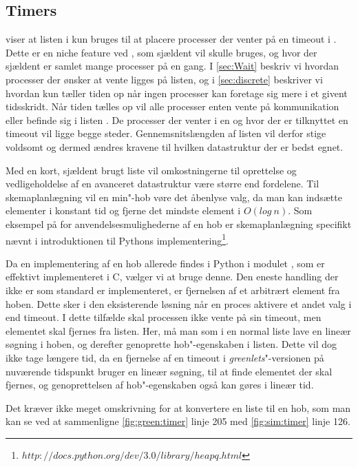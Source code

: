\subsection{Timers}  
 viser at listen  i \pycsp kun bruges til at placere processer der venter på en timeout i . Dette er en niche feature ved \pycsp, som  sjældent vil skulle bruges, og hvor der sjældent er samlet mange processer på en gang. 
 I \cref{sec:Wait} beskriv vi hvordan processer der ønsker at vente ligges på  listen, og i \cref{sec:discrete} beskriver vi hvordan \sched kun tæller tiden op når ingen processer kan foretage sig mere i et givent tidsskridt. Når tiden tælles op vil  alle processer enten vente på kommunikation eller befinde sig i listen . De processer der venter i en  og hvor der er tilknyttet en timeout vil ligge begge steder. Gennemsnitslængden af listen vil derfor stige voldsomt og dermed ændres kravene til hvilken  datastruktur der er bedst egnet. 
 
Med en kort, sjældent brugt liste vil omkostningerne til oprettelse og vedligeholdelse af en avanceret datastruktur være større end fordelene. Til skemaplanlægning  vil en min"-hob vøre det åbenlyse valg, da  man kan  indsætte elementer i konstant tid og fjerne det mindste element i $O(log\ n)$. Som eksempel på for anvendelsesmulighederne af en hob er skemaplanlægning specifikt nævnt i introduktionen til Pythons implementering\footnote{$http://docs.python.org/dev/3.0/library/heapq.html$}.  

Da en implementering af en hob allerede findes i Python i modulet , som er effektivt implementeret i C, vælger vi at bruge denne. Den eneste handling
der ikke er som standard er implementeret, er fjernelsen af et arbitrært element fra hoben. Dette sker i den eksisterende løsning når en proces
aktivere et andet valg i  end timeout. I dette tilfælde skal
processen ikke vente på sin timeout, men elementet skal fjernes fra
 listen. Her, må man som i
en normal liste lave en lineær søgning i hoben, og derefter genoprette
hob"-egenskaben i listen. Dette vil dog ikke tage længere tid, da en fjernelse af en timeout i \emph{greenlets}"-versionen på nuværende
tidspunkt bruger en lineær søgning, til at finde elementet der skal
fjernes, og genoprettelsen af hob"-egenskaben også kan gøres i lineær tid.

Det kræver ikke meget omskrivning for at konvertere en liste til en hob, som man kan se ved at sammenligne \cref{fig:green:timer} linje 205 med \cref{fig:sim:timer} linje 126. 


